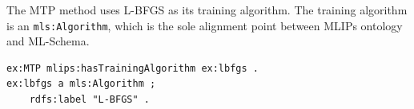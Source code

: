 The MTP method uses L-BFGS as its training algorithm. The training algorithm is an \texttt{mls:Algorithm}, which is the sole alignment point between MLIPs ontology and ML-Schema.
\begin{lstlisting}[language=turtle]
ex:MTP mlips:hasTrainingAlgorithm ex:lbfgs .
ex:lbfgs a mls:Algorithm ;
    rdfs:label "L-BFGS" .
\end{lstlisting}
